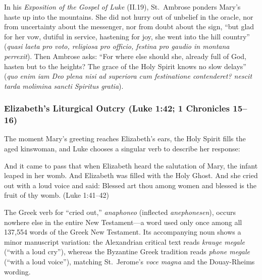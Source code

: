 In his \textit{Exposition of the Gospel of Luke} (II.19), St.\ Ambrose ponders Mary's haste up into the mountains. She did not hurry out of unbelief in the oracle, nor from uncertainty about the messenger, nor from doubt about the sign, ``but glad for her vow, dutiful in service, hastening for joy, she went into the hill country'' (\textit{quasi laeta pro voto, religiosa pro officio, festina pro gaudio in montana perrexit}). Then Ambrose asks: ``For where else should she, already full of God, hasten but to the heights? The grace of the Holy Spirit knows no slow delays'' (\textit{quo enim iam Deo plena nisi ad superiora cum festinatione contenderet? nescit tarda molimina sancti Spiritus gratia}).

\subsubsection{Elizabeth's Liturgical Outcry (Luke 1:42; 1 Chronicles 15--16)}

The moment Mary's greeting reaches Elizabeth's ears, the Holy Spirit fills the aged kinswoman, and Luke chooses a singular verb to describe her response:

\begin{scriptureblock}
And it came to pass that when Elizabeth heard the salutation of Mary, the infant leaped in her womb. And Elizabeth was filled with the Holy Ghost. And she cried out with a loud voice and said: Blessed art thou among women and blessed is the fruit of thy womb. \textnormal{(Luke 1:41--42)}
\end{scriptureblock}

The Greek verb for ``cried out,'' \textit{anaphoneo} (inflected \textit{anephonesen}), occurs nowhere else in the entire New Testament---a word used only once among all 137,554 words of the Greek New Testament. Its accompanying noun shows a minor manuscript variation: the Alexandrian critical text reads \textit{krauge megale} (``with a loud cry''), whereas the Byzantine Greek tradition reads \textit{phone megale} (``with a loud voice''), matching St.\ Jerome's \textit{voce magna} and the Douay-Rheims wording.

